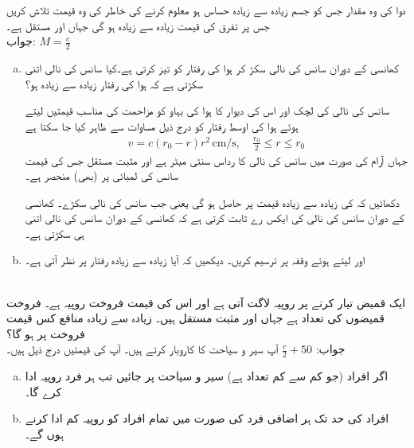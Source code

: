 \\
\\
دوا کی وہ مقدار جس کو جسم زیادہ سے زیادہ حساس ہو معلوم کرنے کی خاطر  کی وہ قیمت تلاش کریں جس پر تفرق  کی قیمت زیادہ سے زیادہ ہو گی جہاں  اور  مستقل ہے۔\\
جواب:\quad
$M=\tfrac{c}{2}$
\begin{enumerate}[a.]
\item
کھانسی کے دوران سانس کی نالی سکڑ کر ہوا کی رفتار کو تیز کرتی ہے۔کیا سانس کی نالی اتنی سکڑتی ہے کہ ہوا کی رفتار زیادہ سے زیادہ ہو؟

سانس کی نالی کی لچک اور اس کی دیوار کا ہوا کی بہاو کو مزاحمت کی  مناسب قیمتیں لیتے ہوئے ہوا کی اوسط رفتار  کو درج ذیل مساوات سے ظاہر کیا جا سکتا ہے
\begin{align*}
v=c(r_0-r)r^2\,\si{\centi\meter\per\second},\quad \frac{r_0}{2}\le r\le r_0
\end{align*}
جہاں آرام کی صورت میں سانس کی نالی کا رداس  سنٹی میٹر ہے اور  مثبت مستقل جس کی قیمت سانس کی لمبائی پر (بھی) منحصر ہے۔

دکھائیں کہ  کی زیادہ سے زیادہ قیمت  پر حاصل ہو گی یعنی جب سانس کی نالی  سکڑے۔ کھانسی کے دوران سانس کی نالی کی  ایکس رے ثابت کرتی ہے کہ کھانسی کے دوران سانس  کی نالی اتنی ہی سکڑتی ہے۔ 
\item
{} اور  لیتے ہوئے وقفہ  پر  ترسیم کریں۔ دیکھیں کہ آیا زیادہ سے زیادہ رفتار  پر نظر آتی ہے۔
\end{enumerate}
\\
ایک قمیض تیار کرنے پر  روپیہ لاگت آتی ہے اور اس کی قیمت فروخت  روپیہ ہے۔ فروخت قمیضوں کی تعداد   ہے جہاں  اور  مثبت مستقل ہیں۔ زیادہ سے زیادہ منافع کس قیمت فروخت پر ہو گا؟\\
جواب:\quad
$\tfrac{c}{2}+50$
آپ سیر و سیاحت کا کاروبار کرتے ہیں۔ آپ کی قیمتیں درج ذیل ہیں۔
\begin{enumerate}[a.]
\item
اگر  افراد (جو کم سے کم تعداد ہے) سیر و سیاحت پر جائیں تب ہر فرد  روپیہ ادا کرے گا۔  
\item
{} افراد کی حد تک ہر اضافی فرد کی صورت میں تمام افراد کو  روپیہ کم ادا کرنے ہوں گے۔ 
\end{enumerate}
